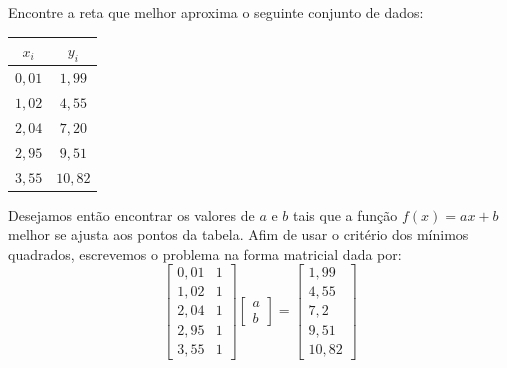 \documentclass[main.tex]{subfiles}
\begin{document}
\begin{ex} Encontre a reta que melhor aproxima o seguinte conjunto de dados:
  \begin{center}
    \begin{tabular}{|c|c|}
      \hline
      $x_i$ & $y_i$\\
      \hline
      $0,01$ & $1,99$\\
      $1,02$ & $4,55$\\
      $2,04$ & $7,20$\\
      $2,95$ & $9,51$\\
      $3,55$ & $10,82$\\
      \hline
    \end{tabular}
  \end{center}
\end{ex}
\begin{sol}
Desejamos então encontrar os valores de $a$ e $b$ tais que a função $f(x)=ax+b$ melhor se ajusta aos pontos da tabela. Afim de usar  o critério dos mínimos quadrados, escrevemos o problema na forma matricial dada por:
$$
\left[\begin{array}{cc}
0,01 &1\\
1,02 &1\\
2,04 &1\\
2,95 &1\\
3,55 &1
\end{array}
\right]
\left[\begin{array}{c}
a\\
b
\end{array}
\right]
=
\left[\begin{array}{c}
1,99\\
4,55\\
7,2\\
9,51\\
10,82
\end{array}
\right]
$$


\end{sol}
\end{document}
